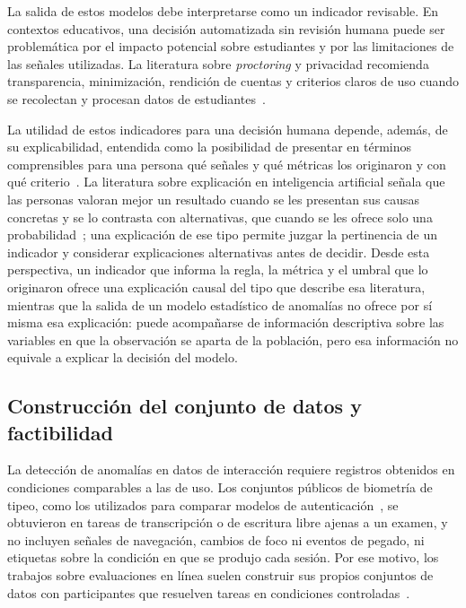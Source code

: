 La salida de estos modelos debe interpretarse como un indicador revisable. En contextos educativos, una decisión automatizada sin revisión humana puede ser problemática por el impacto potencial sobre estudiantes y por las limitaciones de las señales utilizadas. La literatura sobre \textit{proctoring} y privacidad recomienda transparencia, minimización, rendición de cuentas y criterios claros de uso cuando se recolectan y procesan datos de estudiantes~\parencite{Mutimukwe2023}.

La utilidad de estos indicadores para una decisión humana depende, además, de su explicabilidad, entendida como la posibilidad de presentar en términos comprensibles para una persona qué señales y qué métricas los originaron y con qué criterio~\parencite{DoshiVelez2017}. La literatura sobre explicación en inteligencia artificial señala que las personas valoran mejor un resultado cuando se les presentan sus causas concretas y se lo contrasta con alternativas, que cuando se les ofrece solo una probabilidad~\parencite{Miller2019}; una explicación de ese tipo permite juzgar la pertinencia de un indicador y considerar explicaciones alternativas antes de decidir. Desde esta perspectiva, un indicador que informa la regla, la métrica y el umbral que lo originaron ofrece una explicación causal del tipo que describe esa literatura, mientras que la salida de un modelo estadístico de anomalías no ofrece por sí misma esa explicación: puede acompañarse de información descriptiva sobre las variables en que la observación se aparta de la población, pero esa información no equivale a explicar la decisión del modelo.

\subsection{Construcción del conjunto de datos y factibilidad}
\label{sec:marco_dataset}

La detección de anomalías en datos de interacción requiere registros obtenidos en condiciones comparables a las de uso. Los conjuntos públicos de biometría de tipeo, como los utilizados para comparar modelos de autenticación~\parencite{Killourhy2009, Acien2022}, se obtuvieron en tareas de transcripción o de escritura libre ajenas a un examen, y no incluyen señales de navegación, cambios de foco ni eventos de pegado, ni etiquetas sobre la condición en que se produjo cada sesión. Por ese motivo, los trabajos sobre evaluaciones en línea suelen construir sus propios conjuntos de datos con participantes que resuelven tareas en condiciones controladas~\parencite{Kundu2024, Mehta2025}.

